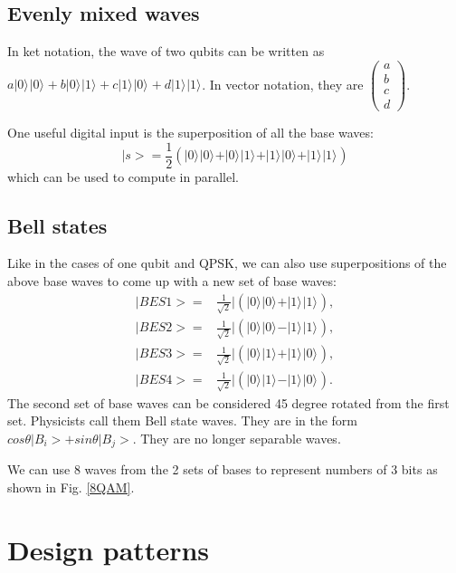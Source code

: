 \documentclass{book}
\newcommand{\keta}[2][]{\vert {#2} \rangle_{#1}}
\begin{document}
\subsection{Evenly mixed waves}
In ket notation, the wave of two qubits can be written as
$a\keta{0}\keta{0} + b \keta{0}\keta{1} + c \keta{1}\keta{0} + d \keta{1}\keta{1}$.
In vector notation, they are
$
\begin{pmatrix}
    a \\
    b \\
    c \\
    d
\end{pmatrix}$.

One useful digital input is the superposition of all the base waves:
\begin{equation}
    |s> = \frac 1 2 (\keta{0}\keta{0}+\keta{0}\keta{1}+\keta{1}\keta{0}+\keta{1}\keta{1})
\end{equation}
which can be used to compute in parallel.

\subsection{Bell states}
Like in the cases of one qubit and QPSK, we can also use superpositions of the above base waves to come up with a new set of base waves:
\begin{equation}
\begin{array}{rl}
    |BES1> =& \frac 1 {\sqrt 2}| (\keta{0}\keta{0}+\keta{1}\keta{1}),\\
    |BES2> =& \frac 1 {\sqrt 2}| (\keta{0}\keta{0}-\keta{1}\keta{1}),\\
    |BES3> =& \frac 1 {\sqrt 2}| (\keta{0}\keta{1}+\keta{1}\keta{0}),\\
    |BES4> =& \frac 1 {\sqrt 2}| (\keta{0}\keta{1}-\keta{1}\keta{0}).
\end{array}
\end{equation}
The second set of base waves can be considered 45 degree rotated from the first set. Physicists call them Bell state waves. They are in the form $cos\theta |B_i> + sin\theta |B_j>$. They are no longer separable waves.

We can use 8 waves from the 2 sets of bases to represent numbers of 3 bits as shown in Fig. \ref{8QAM}.

\section{Design patterns}
\end{document}
